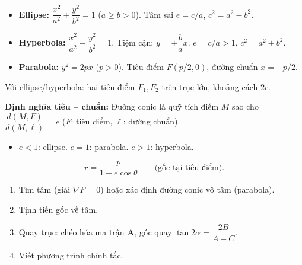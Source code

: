 \documentclass[12pt,a4paper]{article}
\begin{document}
\begin{congthuc}[title={Phương trình chính tắc}]
  \begin{itemize}
    \item \textbf{Ellipse:} $\dfrac{x^2}{a^2} + \dfrac{y^2}{b^2} = 1$ \;($a \ge b > 0$). Tâm sai $e = c/a$, $c^2 = a^2 - b^2$.
    \item \textbf{Hyperbola:} $\dfrac{x^2}{a^2} - \dfrac{y^2}{b^2} = 1$. Tiệm cận: $y = \pm\dfrac{b}{a}x$. $e = c/a > 1$, $c^2 = a^2 + b^2$.
    \item \textbf{Parabola:} $y^2 = 2px$ \;($p > 0$). Tiêu điểm $F(p/2, 0)$, đường chuẩn $x = -p/2$.
  \end{itemize}
\end{congthuc}

\begin{tinhchat}[title={Tiêu điểm, đường chuẩn, tâm sai}]
  Với ellipse/hyperbola: hai tiêu điểm $F_1, F_2$ trên trục lớn, khoảng cách $2c$.

  \textbf{Định nghĩa tiêu -- chuẩn:} Đường conic là quỹ tích điểm $M$ sao cho $\dfrac{d(M, F)}{d(M, \ell)} = e$ ($F$: tiêu điểm, $\ell$: đường chuẩn).
  \begin{itemize}
    \item $e < 1$: ellipse. \quad $e = 1$: parabola. \quad $e > 1$: hyperbola.
  \end{itemize}
\end{tinhchat}

\begin{congthuc}[title={Phương trình tiêu cực}]
  \[
    r = \frac{p}{1 - e\cos\theta} \qquad\text{(gốc tại tiêu điểm)}.
  \]
\end{congthuc}

\begin{phuongphap}[title={Đưa về dạng chính tắc}]
  \begin{enumerate}
    \item Tìm tâm (giải $\nabla F = 0$) hoặc xác định đường conic vô tâm (parabola).
    \item Tịnh tiến gốc về tâm.
    \item Quay trục: chéo hóa ma trận $\mathbf{A}$, góc quay $\tan 2\alpha = \dfrac{2B}{A - C}$.
    \item Viết phương trình chính tắc.
  \end{enumerate}
\end{phuongphap}

\end{document}
